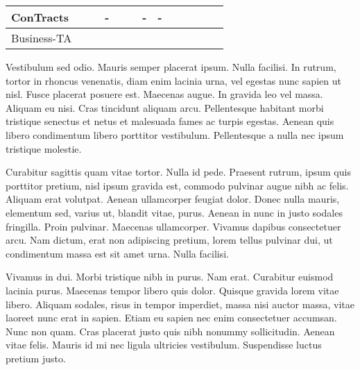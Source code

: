 \begin{table}[h]
\begin{tabular*}{\textwidth}{| l@{\extracolsep\fill} r || c | c | c || c | c || c || c || c | c | c || c | c |}
		\hline
		
		\multicolumn{2}{|l||}{ConTracts} &
		\checkmark &
		\checkmark &
		- &
		\checkmark &
		\checkmark &
		
		-&
		-&
		
		\checkmark &
		\checkmark &
		\checkmark &
		\checkmark &
		\checkmark \\
		
		\hline
		
		\multicolumn{2}{|l||}{Business-TA} &
		\checkmark &
		\checkmark &
		\checkmark &
		\checkmark &
		\checkmark &
		
		\checkmark &
		\checkmark &
		
		\checkmark &
		\checkmark &
		\checkmark &
		\checkmark &
		\checkmark \\			 				  			
		\hline
		
	\end{tabular*}
\end{table}

Vestibulum sed odio. Mauris semper placerat ipsum. Nulla facilisi. In rutrum, tortor in rhoncus venenatis, diam enim lacinia urna, vel egestas nunc sapien ut nisl. Fusce placerat posuere est. Maecenas augue. In gravida leo vel massa. Aliquam eu nisi. Cras tincidunt aliquam arcu. Pellentesque habitant morbi tristique senectus et netus et malesuada fames ac turpis egestas. Aenean quis libero condimentum libero porttitor vestibulum. Pellentesque a nulla nec ipsum tristique molestie.

Curabitur sagittis quam vitae tortor. Nulla id pede. Praesent rutrum, ipsum quis porttitor pretium, nisl ipsum gravida est, commodo pulvinar augue nibh ac felis. Aliquam erat volutpat. Aenean ullamcorper feugiat dolor. Donec nulla mauris, elementum sed, varius ut, blandit vitae, purus. Aenean in nunc in justo sodales fringilla. Proin pulvinar. Maecenas ullamcorper. Vivamus dapibus consectetuer arcu. Nam dictum, erat non adipiscing pretium, lorem tellus pulvinar dui, ut condimentum massa est sit amet urna. Nulla facilisi.

Vivamus in dui. Morbi tristique nibh in purus. Nam erat. Curabitur euismod lacinia purus. Maecenas tempor libero quis dolor. Quisque gravida lorem vitae libero. Aliquam sodales, risus in tempor imperdiet, massa nisi auctor massa, vitae laoreet nunc erat in sapien. Etiam eu sapien nec enim consectetuer accumsan. Nunc non quam. Cras placerat justo quis nibh nonummy sollicitudin. Aenean vitae felis. Mauris id mi nec ligula ultricies vestibulum. Suspendisse luctus pretium justo. 

